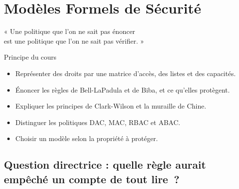 
\chapter{Modèles Formels de Sécurité}
\label{chap:modeles}

\epigraph{%
    « Une politique que l'on ne sait pas énoncer\\
    est une politique que l'on ne sait pas vérifier. »%
}{Principe du cours}


\begin{boxobjectifs}
\begin{itemize}
    \item Représenter des droits par une matrice d'accès, des listes et
          des capacités.
    \item Énoncer les règles de Bell-LaPadula et de Biba, et ce qu'elles
          protègent.
    \item Expliquer les principes de Clark-Wilson et la muraille de Chine.
    \item Distinguer les politiques DAC, MAC, RBAC et ABAC.
    \item Choisir un modèle selon la propriété à protéger.
\end{itemize}
\end{boxobjectifs}

\bigskip

\section*{Question directrice : quelle règle aurait empêché un compte de tout lire~?}


